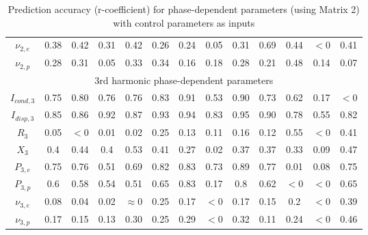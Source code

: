 \documentclass[12pt]{iopart}
\begin{document}
\begin{table}[]
\begin{tabular}{|*{13}{c|}}
$\nu_{2,e}$ &0.38 &0.42 &0.31 &0.42 &0.26 &0.24 &0.05 &0.31 &0.69 &0.44 &$<0$ &0.41\\
$\nu_{2,p}$ &0.28 &0.31 &0.05 &0.33 &0.34 &0.16 &0.18 &0.28 &0.21 & 0.48 &0.14 & 0.07\\
 \hline
 \multicolumn{13}{c}{3rd harmonic phase-dependent parameters} \\
        \hline
$I_{cond,3}$ &0.75 &0.80 &0.76 &0.76 & 0.83& 0.91 &0.53 &0.90 &0.73 &0.62 &0.17 &$<0$\\ 
$I_{disp,3}$ &0.85 &0.86 &0.92 &0.87 &0.93 &0.94 &0.83 &0.95 &0.90 &0.78 &0.55 &0.82\\
$R_{3}$ &0.05 &$<0$ &0.01 &0.02 &0.25 &0.13 &0.11 &0.16 &0.12 &0.55 & $<0$&0.41\\
$X_{3}$ &0.4 &0.44 &0.4 &0.53 &0.41 &0.27 &0.02 &0.37 & 0.37& 0.33& 0.09&0.47\\
$P_{3,e}$ &0.75 &0.76 &0.51 &0.69 & 0.82& 0.83&0.73 &0.89 &0.77 &0.01 &0.08 &0.75\\
$P_{3,p}$ &0.6 &0.58 & 0.54&0.51 &0.65 &0.83 &0.17 &0.8 &0.62 &$<0$ &$<0$ &0.65\\
$\nu_{3,e}$ &0.08 &0.04 &0.02 & $\approx 0$ &0.25 &0.17 &$<0$ &0.17 & 0.15&0.2 &$<0$ &0.39\\
$\nu_{3,p}$ &0.17 &0.15 &0.13 &0.30 &0.25 &0.29 &$<0$ &0.32 &0.11 &0.24 & $<0$&0.46\\
 \hline
 
\end{tabular}

 \caption{Prediction accuracy (r-coefficient) for phase-dependent parameters (using Matrix 2) with control parameters as inputs}
 
\end{table}

\end{document}
